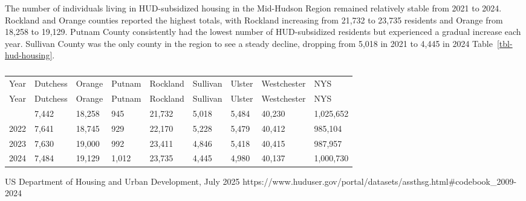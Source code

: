 \documentclass[
  english,
  letterpaper,
]{report}
\begin{document}
The number of individuals living in HUD-subsidized housing in the
Mid-Hudson Region remained relatively stable from 2021 to 2024. Rockland
and Orange counties reported the highest totals, with Rockland
increasing from 21,732 to 23,735 residents and Orange from 18,258 to
19,129. Putnam County consistently had the lowest number of
HUD-subsidized residents but experienced a gradual increase each year.
Sullivan County was the only county in the region to see a steady
decline, dropping from 5,018 in 2021 to 4,445 in 2024
Table~\ref{tbl-hud-housing}.

\begin{longtable}[]{@{}lllllllll@{}}

\caption{\label{tbl-hud-housing}Number of people living in
HUD-Subsidized Housing in the Past 12 Months, 2021--2024}

\tabularnewline

\caption{}\label{T_cf3f6}\tabularnewline
\toprule\noalign{}
Year & Dutchess & Orange & Putnam & Rockland & Sullivan & Ulster &
Westchester & NYS \\
\midrule\noalign{}
\endfirsthead
\toprule\noalign{}
Year & Dutchess & Orange & Putnam & Rockland & Sullivan & Ulster &
Westchester & NYS \\
\midrule\noalign{}
\endhead
\bottomrule\noalign{}
\endlastfoot
2021 & 7,442 & 18,258 & 945 & 21,732 & 5,018 & 5,484 & 40,230 &
1,025,652 \\
2022 & 7,641 & 18,745 & 929 & 22,170 & 5,228 & 5,479 & 40,412 &
985,104 \\
2023 & 7,630 & 19,000 & 992 & 23,411 & 4,846 & 5,418 & 40,415 &
987,957 \\
2024 & 7,484 & 19,129 & 1,012 & 23,735 & 4,445 & 4,980 & 40,137 &
1,000,730 \\

\end{longtable}

\begin{tcolorbox}[enhanced jigsaw, breakable, leftrule=.75mm, title=\textcolor{quarto-callout-note-color}{\faInfo}\hspace{0.5em}{Source}, bottomrule=.15mm, opacityback=0, left=2mm, colback=white, bottomtitle=1mm, coltitle=black, colbacktitle=quarto-callout-note-color!10!white, colframe=quarto-callout-note-color-frame, opacitybacktitle=0.6, toptitle=1mm, titlerule=0mm, arc=.35mm, rightrule=.15mm, toprule=.15mm]

US Department of Housing and Urban Development, July 2025
https://www.huduser.gov/portal/datasets/assthsg.html\#codebook\_2009-2024

\end{tcolorbox}
\end{document}
